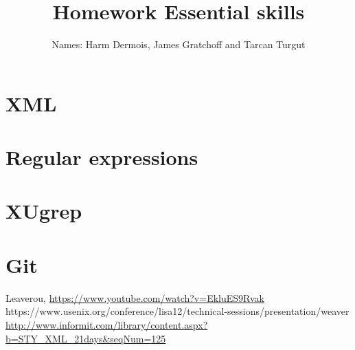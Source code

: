 \documentclass[12pt,a4paper]{article}
\begin{document}
\title{Homework Essential skills}
\author{Names: Harm Dermois, James Gratchoff and Tarcan Turgut }
\date{}
\maketitle

\section{XML}

\section{Regular expressions}

\section{XUgrep}

\section{Git}


\begin{thebibliography}{9}
	Leaverou,
	\url{https://www.youtube.com/watch?v=EkluES9Rvak}
	https://www.usenix.org/conference/lisa12/technical-sessions/presentation/weaver
	\url{http://www.informit.com/library/content.aspx?b=STY_XML_21days&seqNum=125}
\end{thebibliography}
\end{document}
